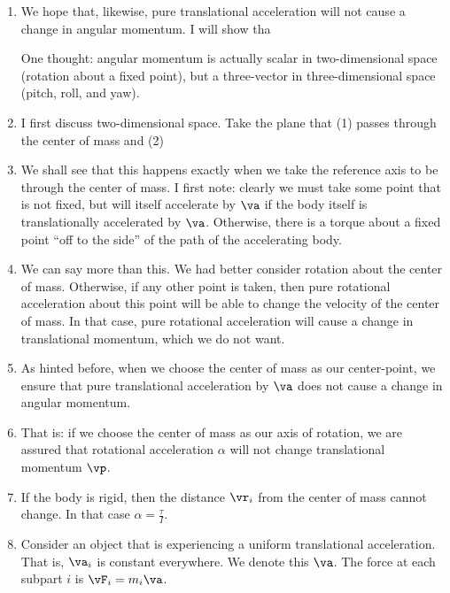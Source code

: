 \begin{enumerate}
  \item We hope that, likewise, pure translational acceleration will not
  cause a change in angular momentum. I will show tha



  One thought: angular momentum is
  actually scalar in two-dimensional space (rotation about a fixed
  point), but a three-vector in three-dimensional space (pitch, roll,
  and yaw).

  \item I first discuss two-dimensional space. Take the plane that (1)
  passes through the center of mass and (2)

  \item We shall see that this happens exactly when we take the
  reference axis to be through the center of mass. I first note: clearly
  we must take some point that is not fixed, but will itself accelerate
  by $\va$ if the body itself is translationally accelerated by $\va$.
  Otherwise, there is a torque about a fixed point ``off to the side''
  of the path of the accelerating body.

  \item We can say more than this. We had better consider rotation about
  the center of mass. Otherwise, if any other point is taken, then pure
  rotational acceleration about this point will be able to change the
  velocity of the center of mass. In that case, pure rotational
  acceleration will cause a change in translational momentum, which we
  do not want.

  \item As hinted before, when we choose the center of mass as our
  center-point, we ensure that pure translational acceleration by $\va$
  does not cause a change in angular momentum.

  \item That is: if we choose the center of mass as our axis of
  rotation, we are assured that rotational acceleration $\alpha$ will
  not change translational momentum $\vp$.

  \item If the body is rigid, then the distance $\vr_i$ from the center
  of mass cannot change. In that case $\alpha = \frac{\tau}{I}$.

  \item Consider an object that is experiencing a uniform translational
  acceleration. That is, $\va_i$ is constant everywhere. We denote this
  $\va$. The force at each subpart $i$ is $\vF_i = m_i \va$.


\end{enumerate}
